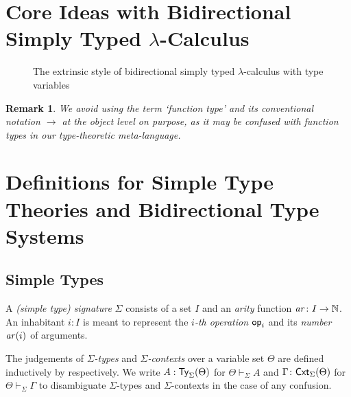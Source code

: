 \documentclass[acmsmall,screen]{acmart}
\theoremstyle{acmdefinition}
\newtheorem{remark}[theorem]{Remark}}
\begin{document}
\section{Core Ideas with Bidirectional Simply Typed \texorpdfstring{$\lambda$}{lambda}-Calculus} \label{sec:key-ideas}
\begin{figure}
  \centering
  \small
  \caption{The extrinsic style of bidirectional simply typed $\lambda$-calculus with type variables}
  \label{fig:bi-stlc}
\end{figure}
\begin{remark}
  We avoid using the term `function type' and its conventional notation $\to$ at the object level on purpose, as it may be confused with function types in our type-theoretic meta-language.
\end{remark}

\section{Definitions for Simple Type Theories and Bidirectional Type Systems}\label{sec:defs}

\subsection{Simple Types}
\begin{definition}
  A \emph{(simple type) signature} $\Sigma$ consists of a set $I$ and an \emph{arity} function $\mathit{ar}\colon I \to \mathbb{N}$.
  An inhabitant $i : I$ is meant to represent the \emph{$i$-th operation} $\mathsf{op}_i$ and its \emph{number} $ \mathit{ar}(i)$ of arguments.

  The judgements of \emph{$\Sigma$-types} and \emph{$\Sigma$-contexts} over a variable set $\Theta$ are defined inductively by  respectively.
We write $A : \mathsf{Ty}_{\Sigma}(\Theta)$ for $\Theta \vdash_{\Sigma} A$ and $\Gamma \colon \mathsf{Cxt}_{\Sigma}(\Theta)$ for $\Theta \vdash_{\Sigma} \Gamma$ to disambiguate $\Sigma$-types and $\Sigma$-contexts in the case of any confusion.
\end{definition}
\end{document}
